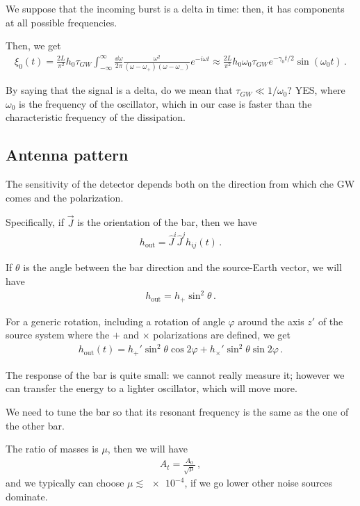 \documentclass[main.tex]{subfiles}
\begin{document}
We suppose that the incoming burst is a delta in time: then, it has components at all possible frequencies.

Then, we get 
%
\begin{align}
\xi_0 (t) = \frac{2L}{\pi^2} h_0 \tau_{GW} \int_{- \infty }^{ \infty } \frac{ \dd{\omega }}{2 \pi } \frac{\omega^2}{(\omega - \omega_{+}) (\omega-\omega_{-})} e^{-i \omega t} \approx \frac{2L }{\pi^2} h_0 \omega_0 \tau_{GW} e^{-\gamma_0 t / 2} \sin(\omega_0 t)
\,.
\end{align}

By saying that the signal is a delta, do we mean that \(\tau_{GW} \ll 1 / \omega_0 \)? YES, where \(\omega_0 \) is the frequency of the oscillator, which in our case is faster than the characteristic frequency of the dissipation. 

\subsection{Antenna pattern}

The sensitivity of the detector depends both on the direction from which che GW comes and the polarization.

Specifically, if \(\vec{J}\) is the orientation of the bar, then we have 
%
\begin{align}
h _{\text{out}} = \hat{J}^{i} \hat{J}^{j} h_{ij} (t)
\,.
\end{align}

If \(\theta \) is the angle between the bar direction and the source-Earth vector, we will have 
%
\begin{align}
h _{\text{out}} = h_{+} \sin^2\theta 
\,.
\end{align}

For a generic rotation, including a rotation of angle \(\varphi \) around the axis \(z'\) of the source system where the \(+\) and \(\times \) polarizations are defined, we get 
%
\begin{align}
h _{\text{out}} (t) = h_{+}' \sin^2\theta \cos 2 \varphi + h_{ \times }' \sin^2 \theta \sin 2 \varphi 
\,.
\end{align}

The response of the bar is quite small: we cannot really measure it; however we can transfer the energy to a lighter oscillator, which will move more. 

We need to tune the bar so that its resonant frequency is the same as the one of the other bar. 

The ratio of masses is \(\mu \), then we will have 
%
\begin{align}
A_t = \frac{A_0 }{\sqrt{\mu }}
\,,
\end{align}
%
and we typically can choose \(\mu \lesssim \num{e-4}\), if we go lower other noise sources dominate.
\end{document}
